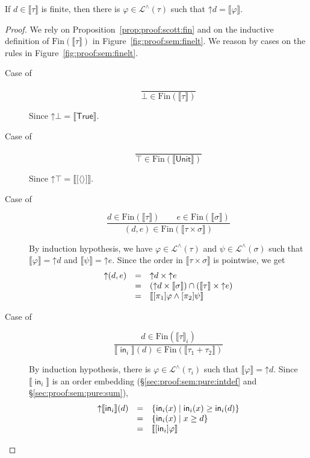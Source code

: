\documentclass[%
  a4paper,
  UKenglish,
  cleveref,
  autoref,
  thm-restate,
  numberwithinsect,
]{lipics-v2021}
\newcommand\pair[1]{{\langle #1\rangle}}
\newcommand\up{\mathord{\uparrow}}
\newcommand\I[1]{\llbracket #1 \rrbracket} %
\newcommand\temp[1]{\mathsf{#1}}
\newcommand\True{\temp{True}}
\newcommand\term[1]{\mathsf{#1}}
\newcommand\type[1]{\term{#1}}
\newcommand\inj{\mathop{\term{in}}}
\newcommand\Unit{\type{Unit}}
\newcommand\PT{\tau}		%
\newcommand\PTbis{\sigma}	%
\newcommand\Fin{\mathrm{Fin}}	%
\newcommand\Lang{\mathcal{L}}
\newcommand\form[1]{\lbrack #1 \rbrack}
\begin{document}
\begin{lemma}
\label{lem:proof:sem:coprime-open:fin}
If $d \in \I\PT$ is finite,
then there is
$\varphi \in \Lang^\land(\PT)$
such that $\up d = \I\varphi$.
\end{lemma}


\begin{proof}
We rely on Proposition~\ref{prop:proof:scott:fin}
and on the inductive definition of $\Fin(\I\PT)$ in Figure~\ref{fig:proof:sem:finelt}.
We reason by cases on the rules 
in Figure~\ref{fig:proof:sem:finelt}.
\begin{description}
\item[Case of]
\[
\dfrac{}
  {\bot \in \Fin(\I\PT)}  
\]

\noindent
Since $\up \bot = \I{\True}$.

\item[Case of]
\[
\dfrac{}
  {\top \in \Fin(\I\Unit)}
\]

\noindent
Since $\up \top = \I{\form{\pair{}}}$.

\item[Case of]
\[
\dfrac{d \in \Fin(\I\PT)
  \qquad
  e \in \Fin(\I\PTbis)}
  {(d,e) \in \Fin(\I{\PT \times \PTbis})}
\]

\noindent
By induction hypothesis, we
have $\varphi \in \Lang^\land(\PT)$
and $\psi \in \Lang^\land(\PTbis)$
such that
$\I\varphi = \up d$
and
$\I\psi = \up e$.
Since the order in $\I{\PT \times \PTbis}$
is pointwise, we get
\[
\begin{array}{l l l}
  \up(d,e)
& =
& \up d \times \up e
\\
%
& =
& (\up d \times \I\PTbis)
  \cap
  (\I\PT \times \up e)
\\
%
& =
& \I{\form{\pi_1}\varphi \land \form{\pi_2}\psi}
\end{array}
\]

\item[Case of]
\[
\dfrac{d \in \Fin(\I\PT_i)}
  {\I{\inj_i}(d) \in \Fin(\I{\PT_1 + \PT_2})}
\]

By induction hypothesis, there is
$\varphi \in \Lang^\land(\PT_i)$
such that $\I\varphi = \up d$.
Since $\I{\inj_i}$ is an order embedding
(\S\ref{sec:proof:sem:pure:intdef} and \S\ref{sec:proof:sem:pure:sum}),
\[
\begin{array}{l l l}
  \up \I{\inj_i}(d)
& =
& \left\{
  \inj_i(x) \mid \inj_i(x) \geq \inj_i(d)
  \right\}
\\
%
& =
& \left\{
  \inj_i(x) \mid x \geq d
  \right\}
\\
%
& =
& \I{\form{\inj_i}\varphi}
\end{array}
\]


\end{description}
\end{proof}
\end{document}
